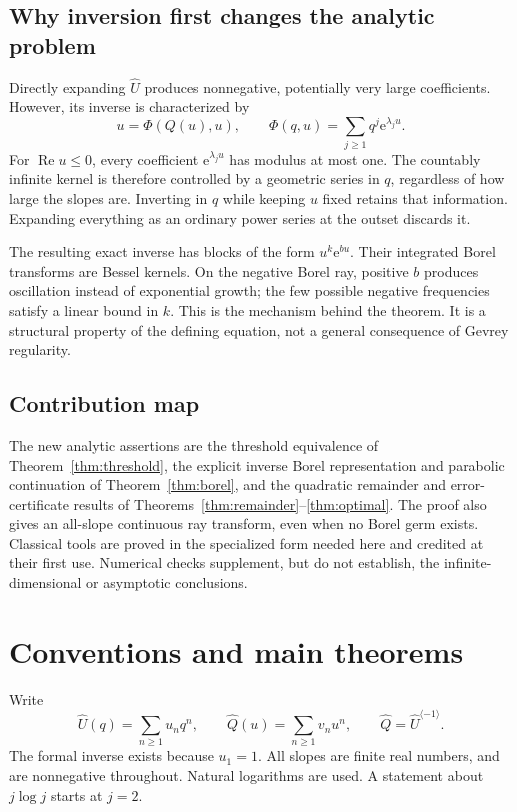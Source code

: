 \documentclass[11pt,a4paper]{article}
\numberwithin{equation}{section}
\theoremstyle{definition}
\theoremstyle{remark}
\newcommand{\U}{\widehat U}
\newcommand{\Q}{\widehat Q}
\newcommand{\ee}{\mathrm e}
\newcommand{\Ree}{\operatorname{Re}}
\newcommand{\inv}{\langle-1\rangle}
\begin{document}
\subsection{Why inversion first changes the analytic problem}
Directly expanding $\U$ produces nonnegative, potentially very large
coefficients.  However, its inverse is characterized by
\begin{equation}
 u=\Phi(Q(u),u),\qquad
 \Phi(q,u)=\sum_{j\ge1}q^j\ee^{\lambda_j u}.
 \label{eq:literal}
\end{equation}
For $\Ree u\le0$, every coefficient $\ee^{\lambda_j u}$ has modulus at most
one.  The countably infinite kernel is therefore controlled by a geometric
series in $q$, regardless of how large the slopes are.  Inverting in $q$
while keeping $u$ fixed retains that information.  Expanding everything as
an ordinary power series at the outset discards it.

The resulting exact inverse has blocks of the form $u^k\ee^{bu}$.
Their integrated Borel transforms are Bessel kernels.  On the negative
Borel ray, positive $b$ produces oscillation instead of exponential growth;
the few possible negative frequencies satisfy a linear bound in $k$.
This is the mechanism behind the theorem.  It is a structural property of
the defining equation, not a general consequence of Gevrey regularity.

\subsection{Contribution map}
The new analytic assertions are the threshold equivalence of
Theorem~\ref{thm:threshold}, the explicit inverse Borel representation and
parabolic continuation of Theorem~\ref{thm:borel}, and the quadratic
remainder and error-certificate results of
Theorems~\ref{thm:remainder}--\ref{thm:optimal}.  The proof also gives an
all-slope continuous ray transform, even when no Borel germ exists.
Classical tools are proved in the specialized form needed here and credited
at their first use.  Numerical checks supplement, but do not establish,
the infinite-dimensional or asymptotic conclusions.

\section{Conventions and main theorems}
\label{sec:main}

Write
\begin{equation}
 \U(q)=\sum_{n\ge1}u_nq^n,
 \qquad \Q(u)=\sum_{n\ge1}v_nu^n,
 \qquad \Q=\U^{\inv}.
 \label{eq:formal}
\end{equation}
The formal inverse exists because $u_1=1$.  All slopes are finite real
numbers, and are nonnegative throughout.  Natural logarithms are used.
A statement about $j\log j$ starts at $j=2$.
\end{document}
